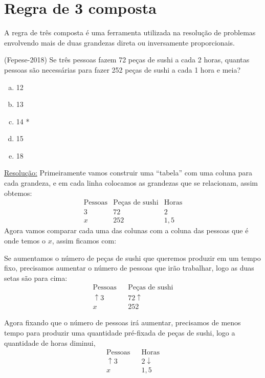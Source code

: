 \section{Regra de 3 composta}

A regra de três composta é uma ferramenta utilizada na resolução de problemas envolvendo mais de duas grandezas direta ou inversamente proporcionais.

\begin{exem}
  (Fepese-2018) Se três pessoas fazem 72 peças de sushi a cada 2 horas, quantas pessoas são necessárias para fazer 252 peças de sushi a cada 1 hora e meia?
  \begin{enumerate}[a)]
  \item 12
  \item 13
  \item 14 *
  \item 15
  \item 18
  \end{enumerate}

  \underline{Resolução:}
  Primeiramente vamos construir uma ``tabela'' com uma coluna para cada grandeza, e em cada linha colocamos as grandezas que se relacionam, assim obtemos:
  \begin{eqnarray*}
   \text{Pessoas} & \text{Peças de sushi} & \text{Horas} \\
   3  & 72 & 2  \\
   x  & 252 & 1,5
  \end{eqnarray*}
  Agora vamos comparar cada uma das colunas com a coluna das pessoas que é onde temos o $x$, assim ficamos com:

  Se aumentamos o número de peças de sushi que queremos produzir em um tempo fixo, precisamos aumentar o número de pessoas que irão trabalhar, logo as duas setas são para cima:
  \begin{eqnarray*}
  \text{Pessoas} & & \text{Peças de sushi}  \\
   \uparrow 3 &  & 72 \uparrow  \\
   x &  & 252
  \end{eqnarray*}

  Agora fixando que o número de pessoas irá aumentar, precisamos de menos tempo para produzir uma quantidade pré-fixada de peças de sushi, logo a quantidade de horas diminui,
  \begin{eqnarray*}
   \text{Pessoas} & & \text{Horas} \\
   \uparrow3 & & 2 \downarrow  \\
   x & & 1,5
  \end{eqnarray*}


\end{exem}
